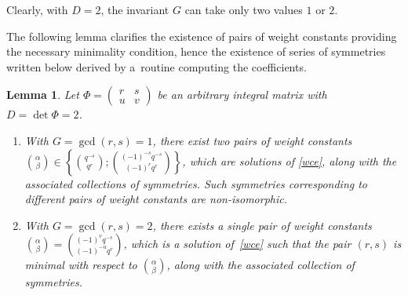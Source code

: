 \documentclass[pdftex]{sigma}
\numberwithin{equation}{section}
\newtheorem{Lemma}[Theorem]{Lemma}
\begin{document}
Clearly, with $D=2$, the invariant $G$ can take only two values $1$ or $2$.

The following lemma clarifies the existence of pairs of weight constants providing the necessary minimality condition, hence the existence of series of symmetries written below derived by a~routine computing the coefficients.

\begin{Lemma}\label{lem_det2}
Let $\Phi=\left(\begin{smallmatrix}r & s\\ u & v\end{smallmatrix}\right)$ be an arbitrary integral matrix with $D=\det\Phi=2$.
\begin{enumerate}\itemsep=0pt
\item[$1.$] With $G=\operatorname{gcd}(r,s)=1$, there exist two pairs of weight constants $\binom{\alpha}{\beta}\!\in\!\left\{\binom{q^{-s}}{q^r};
\binom{(-1)^{-s}q^{-s}}{(-1)^rq^r}\right\}$, which are solutions of \eqref{wce}, along with the associated collections of symmetries. Such symmetries corresponding to different pairs of weight constants are non-isomorphic.
\item[$2.$]With $G=\operatorname{gcd}(r,s)=2$, there exists a single pair of weight constants $\binom{\alpha}{\beta}=\binom{(-1)^vq^{-s}}{(-1)^{-u}q^r}$, which is a solution of~\eqref{wce} such that the pair $(r,s)$ is minimal with respect to $\binom{\alpha}{\beta}$, along with the associated collection of symmetries.
\end{enumerate}
\end{Lemma}
\end{document}
